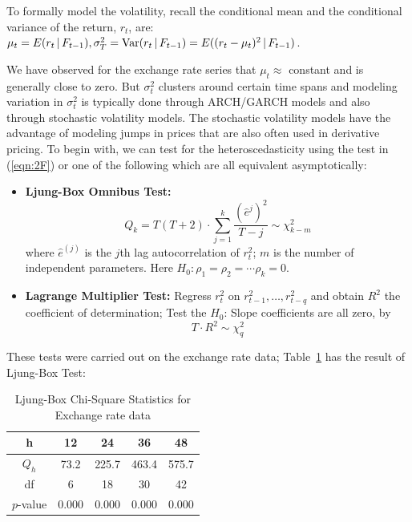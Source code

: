 To formally model the volatility, recall the conditional mean and the conditional variance of the return, $r_t$, are: $\mu_t = E(r_t \,|\,F_{t-1}),\sigma_T^2 = \operatorname{Var}(r_t\,|\,F_{t-1}) = E((r_t - \mu_t)^2\,|\,F_{t-1})$.


We have observed for the exchange rate series that $\mu_t \approx$ constant and is generally
close to zero. But $\sigma_t^2$ clusters around certain time spans and modeling variation
in $\sigma_t^2$ is typically done through ARCH/GARCH models and also through
stochastic volatility models. The stochastic volatility models have the advantage of modeling jumps in prices that are also often used in derivative pricing. To begin with, we can test for the heteroscedasticity using the test in (\ref{eqn:2F}) or one of the following which are all equivalent asymptotically:
\begin{itemize}
\item \textbf{Ljung-Box Omnibus Test:}
	\begin{equation}\label{eqn:2Qk}
	Q_k = T(T+2) \cdot \sum_{j=1}^k\frac{(\hat{e}^{j})^2}{T - j} \sim \chi_{k-m}^2
	\end{equation}
where $\hat{e}^{(j)}$ is the $j$th lag autocorrelation of $r_t^2$; $m$ is the number of independent parameters. Here $H_0: \rho_1 = \rho_2 = \cdots \rho_k = 0$.

\item \textbf{Lagrange Multiplier Test:} Regress $r_t^2$ on $r_{t-1}^2,\ldots,r_{t-q}^2$ and obtain $R^2$ the coefficient of determination; Test the $H_0$: Slope coefficients are all zero, by
	\begin{equation}\label{eqn:2TstarR}
	T \cdot R^2 \sim \chi_q^2
	\end{equation}
\end{itemize}
These tests were carried out on the exchange rate data; Table~\ref{tab:box} has the result of Ljung-Box Test: 
\begin{table}[!ht]
\centering
\caption{Ljung-Box Chi-Square Statistics for Exchange rate data \label{tab:box}}
	\begin{tabular}{ccccc}
	 h & 12 & 24 & 36 & 48 \\ \hline
	$Q_h$ & 73.2 & 225.7 & 463.4 & 575.7 \\ \hline
	df & 6 & 18 & 30 & 42 \\ \hline
	$p$-value & 0.000 & 0.000 & 0.000 & 0.000 \\
\end{tabular}
\end{table}


